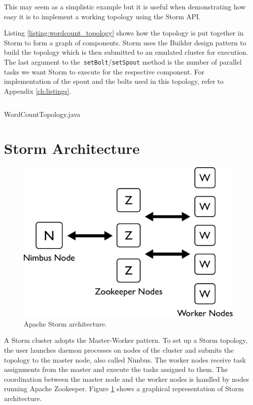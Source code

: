 \documentclass[bsc,deptreport,twoside,singlespacing,normalheadings,parskip]{infthesis}\usepackage[]{graphicx}\usepackage[]{color}
\begin{document}
This may seem as a simplistic example but it is useful when demonstrating how easy it is to implement a working topology using the Storm API.

Listing \ref{listing:wordcount_topology} shows how the topology is put together in Storm to form a graph of components. Storm uses the Builder design pattern \citep{gamma1994design} to build the topology which is then submitted to an emulated cluster for execution. The last argument to the~\texttt{setBolt}/\texttt{setSpout} method is the number of parallel tasks we want Storm to execute for the respective component. For implementation of the spout and the bolts used in this topology, refer to Appendix \ref{ch:listings}.

\begin{listing}[!htb]
\inputminted{java}{code/WordCountTopology.java}
\caption{WordCountTopology.java}
\label{listing:wordcount_topology}
\end{listing}

\section{Storm Architecture}
\label{sec:storm_arch}

\begin{figure}[!htb]
	\centering
	\includegraphics[scale=0.4]{pdf/storm_arch.pdf}
	\caption{Apache Storm architecture.}
	\label{fig:storm_arch}
\end{figure}


A Storm cluster adopts the Master-Worker pattern. To set up a Storm topology, the user launches daemon processes on nodes of the cluster and submits the topology to the master node, also called Nimbus. The worker nodes receive task assignments from the master and execute the tasks assigned to them. The coordination between the master node and the worker nodes is handled by nodes running Apache Zookeeper. Figure \ref{fig:storm_arch} shows a graphical representation of Storm architecture.
\end{document}
